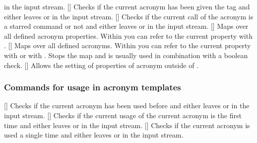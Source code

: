 \documentclass{acro-manual}
\begin{document}
\begin{commands}
    in the input stream.
  []
    Checks if the current acronym has been given the tag  and either
    leaves  or  in the input stream.
  []
    Checks if the current call of the acronym is a starred
    command or not and either leaves  or  in the input
    stream.
  []
    Maps over all defined acronym properties.  Within  you can
    refer to the current property with .
  []
    Maps over all defined acronyms.  Within  you
    can refer to the current property with  or with .
    Stops the map  and is usually used
    in combination with a boolean check.
  []
    Allows the setting of properties of acronym 
    outside of .
\end{commands}

\subsubsection{Commands for usage in acronym templates}
\begin{commands}
  \expandable{}[]
    Checks if the current acronym has been used before and either leaves
     or  in the input stream.
  []
    Checks if the current usage of the current acronym is the first time and
    either leaves  or  in the input stream.
  []
    Checks if the current acronym is used a single time and either leaves
     or  in the input stream.
\end{commands}
\end{document}
